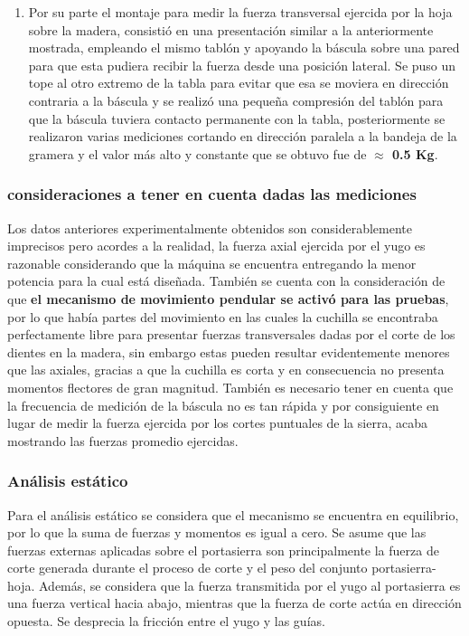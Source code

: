 \documentclass[12pt,letterpaper]{article}
\begin{document}
\begin{enumerate}
    \item Por su parte el montaje para medir la fuerza transversal ejercida por la hoja sobre la madera, consistió en una presentación similar a la anteriormente mostrada, 
    empleando el mismo tablón y apoyando la báscula sobre una pared para que esta pudiera recibir la fuerza desde una posición lateral.
    Se puso un tope al otro extremo de la tabla para evitar que esa se moviera en dirección contraria a la báscula y se realizó una pequeña compresión del tablón para que la báscula tuviera contacto permanente con la tabla,
    posteriormente se realizaron varias mediciones cortando en dirección paralela a la bandeja de la gramera
    y el valor más alto y constante que se obtuvo fue de \textbf{ $\approx$ 0.5 Kg}.
    \end{enumerate}

\subsubsection*{consideraciones a tener en cuenta dadas las mediciones}
Los datos anteriores experimentalmente obtenidos son considerablemente imprecisos pero acordes a la realidad, 
la fuerza axial ejercida por el yugo es razonable considerando que la máquina se encuentra entregando la menor potencia para la cual está diseñada.
También se cuenta con la consideración de que \textbf{el mecanismo de movimiento pendular se activó para las pruebas}, por lo que había partes del movimiento en las cuales la cuchilla se encontraba 
perfectamente libre para presentar fuerzas transversales dadas por el corte de los dientes en la madera, sin embargo estas pueden resultar evidentemente menores que las axiales, gracias a que la cuchilla es corta y en consecuencia no presenta momentos flectores de gran magnitud.
También es necesario tener en cuenta que la frecuencia de medición de la báscula no es tan rápida y por consiguiente 
en lugar de medir la fuerza ejercida por los cortes puntuales de la sierra, acaba mostrando las fuerzas promedio ejercidas.

\subsubsection{Análisis estático}
Para el análisis estático se considera que el mecanismo se encuentra en equilibrio, por lo que la suma de fuerzas y momentos es igual a cero. Se asume que las fuerzas externas aplicadas sobre el portasierra son principalmente la fuerza de corte generada durante el proceso de corte y el peso del conjunto portasierra-hoja. Además, se considera que la fuerza transmitida por el yugo al portasierra es una fuerza vertical hacia abajo, mientras que la fuerza de corte actúa en dirección opuesta. Se desprecia la fricción entre el yugo y las guías. 
\end{document}
